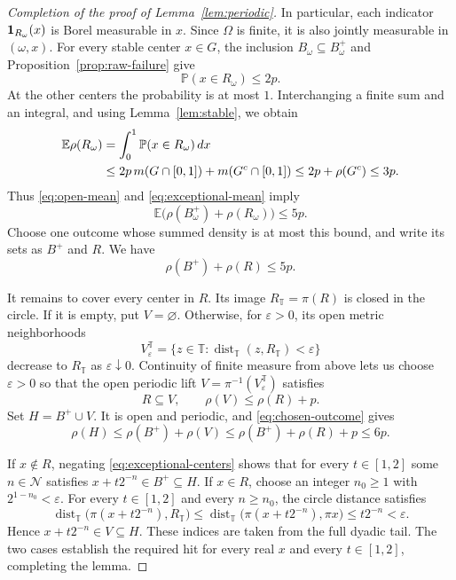 \begin{proof}[Completion of the proof of Lemma~\ref{lem:periodic}]
In particular, each indicator \({\bf1}_{R_\omega}(x)\) is Borel
measurable in \(x\).  Since \(\Omega\) is finite, it is also jointly
measurable in \((\omega,x)\).  For every stable center \(x\in G\),
the inclusion \(B_\omega\subseteq B_\omega^+\) and
Proposition~\ref{prop:raw-failure} give
\[
 \mathbb P(x\in R_\omega)\le2p.
\]
At the other centers the probability is at most \(1\).
Interchanging a finite sum and an integral, and using
Lemma~\ref{lem:stable}, we obtain
\begin{align}
 \mathbb E\rho(R_\omega)
 &=\int_0^1\mathbb P(x\in R_\omega)\,dx \notag\\
 &\le 2p\,m(G\cap[0,1])+m(G^c\cap[0,1])
 \le2p+\rho(G^c)\le3p.
 \label{eq:exceptional-mean}
\end{align}
Thus \eqref{eq:open-mean} and \eqref{eq:exceptional-mean} imply
\[
 \mathbb E\bigl(\rho(B_\omega^+)+\rho(R_\omega)\bigr)\le5p.
\]
Choose one outcome whose summed density is at most this bound, and
write its sets as \(B^+\) and \(R\).  We have
\begin{equation}
 \rho(B^+)+\rho(R)\le5p.
 \label{eq:chosen-outcome}
\end{equation}

It remains to cover every center in \(R\).  Its image
\(R_{\mathbb T}=\pi(R)\) is closed in the circle.  If it is empty,
put \(V=\varnothing\).  Otherwise, for \(\varepsilon>0\), its open
metric neighborhoods
\[
 V_\varepsilon^{\mathbb T}
 =\{z\in\mathbb T:
           \operatorname{dist}_{\mathbb T}(z,R_{\mathbb T})
                          <\varepsilon\}
\]
decrease to \(R_{\mathbb T}\) as \(\varepsilon\downarrow0\).
Continuity of finite measure from above lets us choose
\(\varepsilon>0\) so that the open periodic lift
\(V=\pi^{-1}(V_\varepsilon^{\mathbb T})\) satisfies
\[
 R\subseteq V,\qquad \rho(V)\le\rho(R)+p.
\]
Set \(H=B^+\cup V\).  It is open and periodic, and
\eqref{eq:chosen-outcome} gives
\[
 \rho(H)\le\rho(B^+)+\rho(V)
          \le\rho(B^+)+\rho(R)+p\le6p.
\]

If \(x\notin R\), negating \eqref{eq:exceptional-centers} shows that
for every \(t\in[1,2]\) some \(n\in\mathcal N\) satisfies
\(x+t2^{-n}\in B^+\subseteq H\).
If \(x\in R\), choose an integer \(n_0\ge1\) with
\(2^{1-n_0}<\varepsilon\).  For every \(t\in[1,2]\) and every
\(n\ge n_0\), the circle distance satisfies
\[
 \operatorname{dist}_{\mathbb T}
       \bigl(\pi(x+t2^{-n}),R_{\mathbb T}\bigr)
 \le \operatorname{dist}_{\mathbb T}
       \bigl(\pi(x+t2^{-n}),\pi x\bigr)
 \le t2^{-n}<\varepsilon.
\]
Hence \(x+t2^{-n}\in V\subseteq H\).
These indices are taken from the full dyadic tail.  The two cases
establish the required hit for every real \(x\) and every
\(t\in[1,2]\), completing the lemma.
\end{proof}
